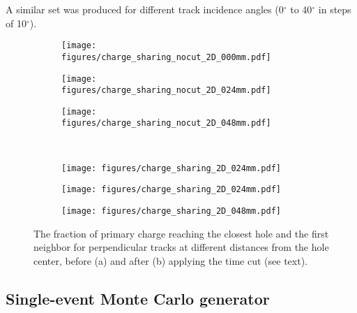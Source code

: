 A similar set was produced for different track incidence angles (0$^\circ$ to 40$^\circ$ in steps of 10$^\circ$). 

\begin{figure}[h]
\begin{subfigure}[t]{0.3\textwidth}\caption{}
\texttt{[image: figures/charge\_sharing\_nocut\_2D\_000mm.pdf]}
\end{subfigure}
\begin{subfigure}[t]{0.3\textwidth}\caption{}
\texttt{[image: figures/charge\_sharing\_nocut\_2D\_024mm.pdf]}
\end{subfigure}
\begin{subfigure}[t]{0.3\textwidth}\caption{}
\texttt{[image: figures/charge\_sharing\_nocut\_2D\_048mm.pdf]}
\end{subfigure}\\
\begin{subfigure}[t]{0.3\textwidth}\caption{}
\texttt{[image: figures/charge\_sharing\_2D\_024mm.pdf]}
\end{subfigure}
\begin{subfigure}[t]{0.3\textwidth}\caption{}
\texttt{[image: figures/charge\_sharing\_2D\_024mm.pdf]}
\end{subfigure}
\begin{subfigure}[t]{0.3\textwidth}\caption{}
\texttt{[image: figures/charge\_sharing\_2D\_048mm.pdf]}
\end{subfigure}
\caption{The fraction of primary charge reaching the closest hole and the first neighbor for perpendicular tracks at different distances from the hole center, before (a) and after (b) applying the time cut (see text).}\label{fig: charge sharing}
\end{figure}

\subsection{Single-event Monte Carlo generator}
\label{sec: single event generator}

